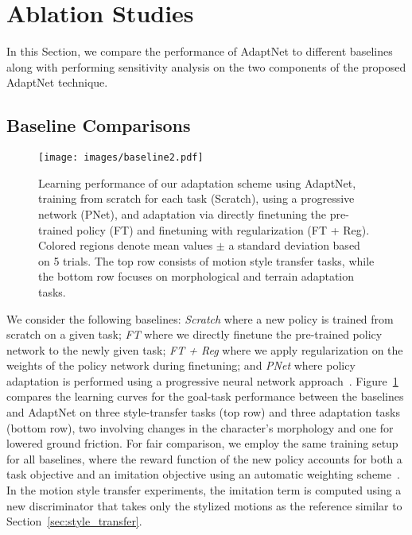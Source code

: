\section{Ablation Studies}
\label{sec:comparison}

In this Section, we %
compare 
the performance of AdaptNet %
to different baselines along with performing sensitivity analysis on the two components of the proposed AdaptNet technique. 


\subsection{Baseline Comparisons}
\label{sec:baselines}
\begin{figure}[t]
    \centering
    \texttt{[image: images/baseline2.pdf]}
    \caption{Learning performance of our adaptation scheme using AdaptNet, training from scratch for each task (Scratch), using a progressive network (PNet), and adaptation via directly finetuning the pre-trained policy (FT) and finetuning with regularization (FT + Reg). Colored regions denote mean values $\pm$ a standard deviation based on 5 trials. The top row consists of 
    motion style transfer tasks, while the bottom row focuses on morphological and terrain adaptation tasks.  %
    }
    \label{fig:baseline}
\end{figure}


We consider the following baselines:  \emph{Scratch} where a new policy is trained from scratch on a given task; \emph{FT} where we directly finetune the pre-trained policy network to the newly given task; \emph{FT + Reg} where we apply regularization on the weights of the policy network during finetuning; and \emph{PNet} where policy adaptation is performed using a progressive neural network approach~\cite{rusu2016progressive}.  
Figure~\ref{fig:baseline} compares the 
learning curves for the goal-task performance between  the baselines and AdaptNet 
on three style-transfer tasks (top row) and three adaptation tasks (bottom row), two involving changes in the character's morphology and one for lowered ground friction.  
For fair comparison, we employ the same 
training setup 
for all baselines, where the reward function of the new policy accounts for both a task objective and an imitation objective using an automatic weighting scheme~\cite{composite}. 
In the motion style transfer experiments, the imitation term is computed using a new discriminator that takes only the stylized motions as the reference similar to Section~\ref{sec:style_transfer}.




